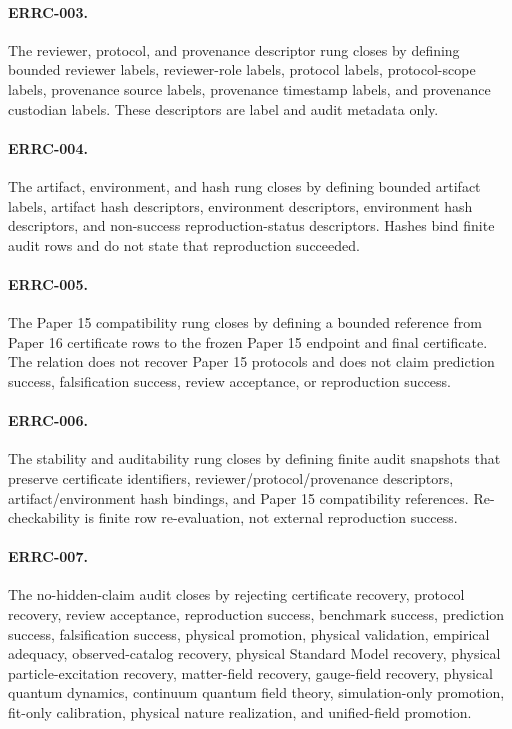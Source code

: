 \documentclass{article}
\begin{document}
\paragraph{ERRC-003.}
The reviewer, protocol, and provenance descriptor rung closes by defining
bounded reviewer labels, reviewer-role labels, protocol labels, protocol-scope
labels, provenance source labels, provenance timestamp labels, and provenance
custodian labels. These descriptors are label and audit metadata only.

\paragraph{ERRC-004.}
The artifact, environment, and hash rung closes by defining bounded artifact
labels, artifact hash descriptors, environment descriptors, environment hash
descriptors, and non-success reproduction-status descriptors. Hashes bind
finite audit rows and do not state that reproduction succeeded.

\paragraph{ERRC-005.}
The Paper 15 compatibility rung closes by defining a bounded reference from
Paper 16 certificate rows to the frozen Paper 15 endpoint and final
certificate. The relation does not recover Paper 15 protocols and does not
claim prediction success, falsification success, review acceptance, or
reproduction success.

\paragraph{ERRC-006.}
The stability and auditability rung closes by defining finite audit snapshots
that preserve certificate identifiers, reviewer/protocol/provenance
descriptors, artifact/environment hash bindings, and Paper 15 compatibility
references. Re-checkability is finite row re-evaluation, not external
reproduction success.

\paragraph{ERRC-007.}
The no-hidden-claim audit closes by rejecting certificate recovery, protocol
recovery, review acceptance, reproduction success, benchmark success,
prediction success, falsification success, physical promotion, physical
validation, empirical adequacy, observed-catalog recovery, physical Standard
Model recovery, physical particle-excitation recovery, matter-field recovery,
gauge-field recovery, physical quantum dynamics, continuum quantum field
theory, simulation-only promotion, fit-only calibration, physical nature
realization, and unified-field promotion.
\end{document}

